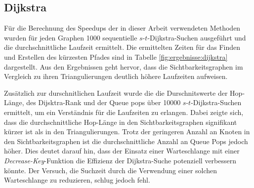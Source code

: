 \subsection{Dijkstra}

Für die Berechnung des Speedups der in dieser Arbeit verwendeten Methoden wurden für jeden Graphen \num{1000} sequentielle $s$-$t$-Dijkstra-Suchen ausgeführt und die durchschnittliche Laufzeit ermittelt.
Die ermittelten Zeiten für das Finden und Erstellen des kürzesten Pfades sind in Tabelle \ref{fig:ergebnisse:dijkstra} dargestellt.
Aus den Ergebnissen geht hervor, dass die Sichtbarkeitsgraphen im Vergleich zu ihren Triangulierungen deutlich höhere Laufzeiten aufweisen.

Zusätzlich zur durschnitlichen Laufzeit wurde die die Durschnitswerte der Hop-Länge, des Dijsktra-Rank und der Queue pops über \num{10000} $s$-$t$-Dijkstra-Suchen ermittelt, um ein Verständnis für die Laufzeiten zu erlangen.
Dabei zeigte sich, dass die durchschnittliche Hop-Länge in den Sichtbarkeitsgraphen signifikant kürzer ist als in den Triangulierungen.
Trotz der geringeren Anzahl an Knoten in den Sichtbarkeitsgraphen ist die durchschnittliche Anzahl an Queue Pops jedoch höher.
Dies deutet darauf hin, dass der Einsatz einer Warteschlange mit einer \emph{Decrease-Key}-Funktion die Effizienz der Dijkstra-Suche potenziell verbessern könnte.
Der Versuch, die Suchzeit durch die Verwendung einer solchen Warteschlange zu reduzieren, schlug jedoch fehl.

